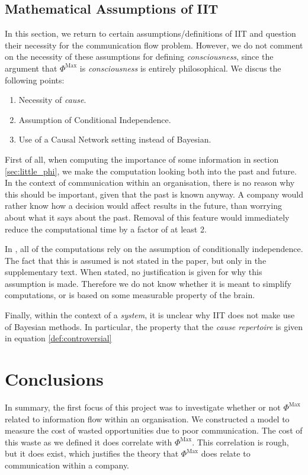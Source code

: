 \subsection{Mathematical Assumptions of IIT}

In this section, we return to certain assumptions/definitions of IIT and question their necessity for the communication flow problem. However, we do not comment on the necessity of these assumptions for defining \textit{consciousness}, since the argument that $\Phi^{\text{Max}}$ is \textit{consciousness} is entirely philosophical. We discus the following points:
\begin{enumerate}
	\item Necessity of \textit{cause}.
	\item Assumption of Conditional Independence.
	\item Use of a Causal Network setting instead of Bayesian.
\end{enumerate}

First of all, when computing the importance of some information in section \ref{sec:little_phi}, we make the computation looking both into the past and future. In the context of communication within an organisation, there is no reason why this should be important, given that the past is known anyway. A company would rather know how a decision would affect results in the future, than worrying about what it says about the past. Removal of this feature would immediately reduce the computational time by a factor of at least 2.

In \cite{oizumi2014phenomenology}, all of the computations rely on the assumption of conditionally independence. The fact that this is assumed is not stated in the paper, but only in the supplementary text. When stated, no justification is given for why this assumption is made. Therefore we do not know whether it is meant to simplify computations, or is based on some measurable property of the brain.


Finally, within the context of a \textit{system}, it is unclear why IIT does not make use of Bayesian methods. In particular, the property that the \textit{cause repertoire} is given in equation \ref{def:controversial} 

\section{Conclusions}
In summary, the first focus of this project was to investigate whether or not $\Phi^\text{Max}$ related to information flow within an organisation. We constructed a model to measure the cost of wasted opportunities due to poor communication. The cost of this waste as we defined it does correlate with $\Phi^\text{Max}$. This correlation is rough, but it does exist, which justifies the theory that $\Phi^\text{Max}$ does relate to communication within a company. 

